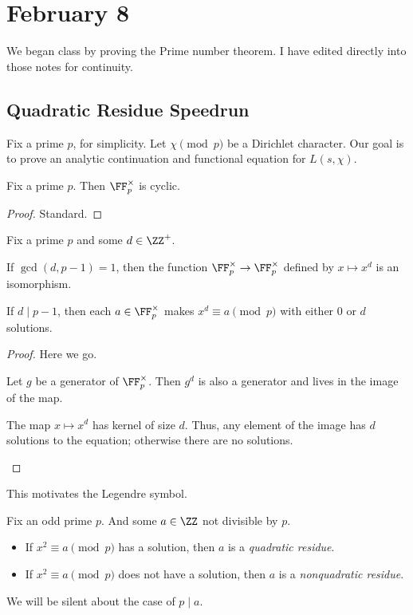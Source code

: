 \documentclass[../notes.tex]{subfiles}
\begin{document}
\section{February 8}

We began class by proving the Prime number theorem. I have edited directly into those notes for continuity.

\subsection{Quadratic Residue Speedrun}
Fix a prime $p$, for simplicity. Let $\chi\pmod p$ be a Dirichlet character. Our goal is to prove an analytic continuation and functional equation for $L(s,\chi)$.
\begin{proposition}
	Fix a prime $p$. Then $\FF_p^\times$ is cyclic.
\end{proposition}
\begin{proof}
	Standard.
\end{proof}
\begin{corollary}
	Fix a prime $p$ and some $d\in\ZZ^+$.
	\begin{listalph}
		\item If $\gcd(d,p-1)=1$, then the function $\FF_p^\times\to\FF_p^\times$ defined by $x\mapsto x^d$ is an isomorphism.
		\item If $d\mid p-1$, then each $a\in\FF_p^\times$ makes $x^d\equiv a\pmod p$ with either $0$ or $d$ solutions.
	\end{listalph}
\end{corollary}
\begin{proof}
	Here we go.
	\begin{listalph}
		\item Let $g$ be a generator of $\FF_p^\times$. Then $g^d$ is also a generator and lives in the image of the map.
		\item The map $x\mapsto x^d$ has kernel of size $d$. Thus, any element of the image has $d$ solutions to the equation; otherwise there are no solutions.
		\qedhere
	\end{listalph}
\end{proof}
This motivates the Legendre symbol.
\begin{definition}
	Fix an odd prime $p$. And some $a\in\ZZ$ not divisible by $p$.
	\begin{itemize}
		\item If $x^2\equiv a\pmod p$ has a solution, then $a$ is a \textit{quadratic residue}.
		\item If $x^2\equiv a\pmod p$ does not have a solution, then $a$ is a \textit{nonquadratic residue}.
	\end{itemize}
	We will be silent about the case of $p\mid a$.
\end{definition}
\end{document}
